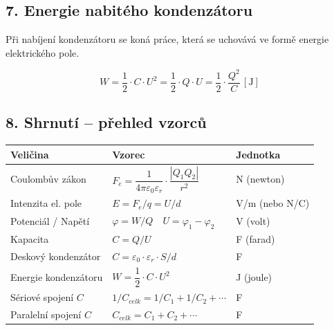 \documentclass[a4paper,10pt]{article}
\newcommand{\jednotka}[1]{\,[\mathrm{#1}]}
\begin{document}
\begin{vysvetlenibox}
\subsection*{7. Energie nabitého kondenzátoru}

Při nabíjení kondenzátoru se koná práce, která se uchovává ve formě energie elektrického pole.
\begin{vzorcebox}
\[
W = \frac{1}{2} \cdot C \cdot U^2 = \frac{1}{2} \cdot Q \cdot U = \frac{1}{2} \cdot \frac{Q^2}{C} \jednotka{J}
\]
\end{vzorcebox}

\subsection*{8. Shrnutí – přehled vzorců}

\begin{center}
\begin{tabularx}{0.97\linewidth}{@{} l l l @{}}
\toprule
\textbf{Veličina} & \textbf{Vzorec} & \textbf{Jednotka} \\
\midrule
Coulombův zákon & $F_e = \dfrac{1}{4\pi\varepsilon_0\varepsilon_r} \cdot \dfrac{|Q_1 Q_2|}{r^2}$ & N (newton) \\
Intenzita el. pole & $E = F_e / q = U / d$ & V/m (nebo N/C) \\
Potenciál / Napětí & $\varphi = W / Q \quad U = \varphi_1 - \varphi_2$ & V (volt) \\
Kapacita & $C = Q / U$ & F (farad) \\
Deskový kondenzátor & $C = \varepsilon_0 \cdot \varepsilon_r \cdot S / d$ & F \\
Energie kondenzátoru & $W = \dfrac{1}{2} \cdot C \cdot U^2$ & J (joule) \\
Sériové spojení $C$ & $1/C_{celk} = 1/C_1 + 1/C_2 + \cdots$ & F \\
Paralelní spojení $C$ & $C_{celk} = C_1 + C_2 + \cdots$ & F \\
\bottomrule
\end{tabularx}
\end{center}

\end{vysvetlenibox}
\end{document}
